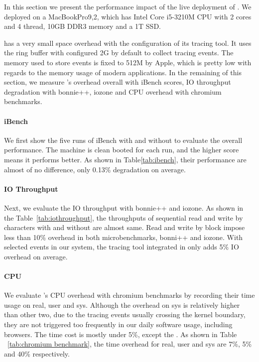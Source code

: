 In this section we present the performance impact of the live deployment of
\xxx. We deployed \xxx on a MacBookPro9,2, which has Intel Core i5-3210M CPU with
2 cores and 4 thread, 10GB DDR3 memory and a 1T SSD.

\xxx has a very small space overhead with the configuration of its tracing
tool. It uses the ring buffer with configured 2G by default to collect tracing
events. The memory used to store events is fixed to 512M by Apple, which is pretty
low with regards to the memory usage of modern applications. In the remaining
of this section, we measure \xxx's overhead overall with iBench scores, IO
throughput degradation with bonnie++, iozone and CPU overhead with chromium
benchmarks.

\paragraph{iBench}

We first show the five runs of iBench with and without \xxx to evaluate the
overall performance. The machine is clean booted for each run, and the higher
score means it performs better. As shown in Table\ref{tab:ibench}, their
performance are almost of no difference, only 0.13\% degradation on average.

\paragraph{IO Throughput}

Next, we evaluate the IO throughput with bonnie++ and iozone. As shown in the
Table~\ref{tab:iothroughput}, the throughputs of sequential read and write
by characters with and without \xxx are almost same. Read and write by block
impose less than 10\% overhead in  both microbenchmarks, bonni++ and iozone.
With selected events in our system, the tracing tool integrated in \xxx
only adds 5\% IO overhead on average.


\paragraph{CPU}

We evaluate \xxx's CPU overhead with chromium benchmarks by recording their
time usage on real, user and sys. Although the overhead on sys is relatively
higher than other two, due to the tracing events usually crossing the
kernel boundary, they are not triggered too frequently in our daily software
usage, including browsers. The time cost is mostly under 5\%, except the
. As shown in Table ~\ref{tab:chromium
benchmark}, the time overhead for real, user and sys are 7\%, 5\% and 40\%
respectively.
